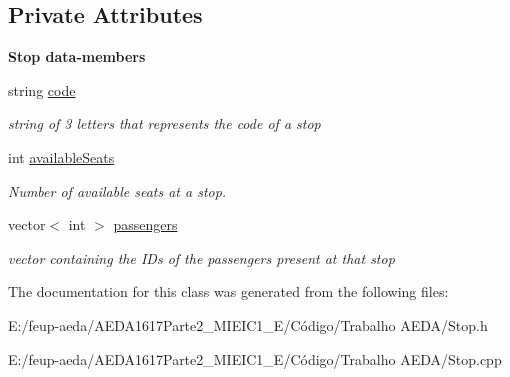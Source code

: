 \subsection*{Private Attributes}
\begin{Indent}\textbf{ Stop data-\/members}\par
\begin{DoxyCompactItemize}
\item 
string \hyperlink{group___date_ga5a0dddd108225fd437be86eed7b3a3ef}{code}
\begin{DoxyCompactList}\small\item\em string of 3 letters that represents the code of a stop \end{DoxyCompactList}\item 
int \hyperlink{group___date_ga459aba5bcfa17889d2f292f3f45528bc}{available\+Seats}
\begin{DoxyCompactList}\small\item\em Number of available seats at a stop. \end{DoxyCompactList}\item 
vector$<$ int $>$ \hyperlink{group___date_ga2886c8f28932f3884ba3e4f741e7ec91}{passengers}
\begin{DoxyCompactList}\small\item\em vector containing the I\+Ds of the passengers present at that stop \end{DoxyCompactList}\end{DoxyCompactItemize}
\end{Indent}


The documentation for this class was generated from the following files\+:\begin{DoxyCompactItemize}
\item 
E\+:/feup-\/aeda/\+A\+E\+D\+A1617\+Parte2\+\_\+M\+I\+E\+I\+C1\+\_\+\+E/\+Código/\+Trabalho A\+E\+D\+A/Stop.\+h\item 
E\+:/feup-\/aeda/\+A\+E\+D\+A1617\+Parte2\+\_\+M\+I\+E\+I\+C1\+\_\+\+E/\+Código/\+Trabalho A\+E\+D\+A/Stop.\+cpp\end{DoxyCompactItemize}
